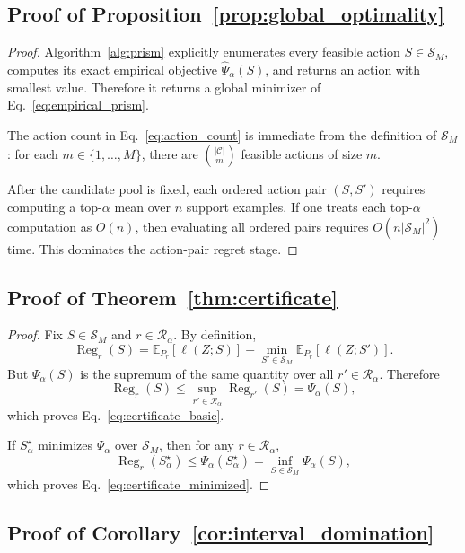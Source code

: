 \documentclass{article}
\newcommand{\EE}{\mathbb{E}}
\newcommand{\cC}{\mathcal{C}}
\newcommand{\cR}{\mathcal{R}}
\newcommand{\cS}{\mathcal{S}}
\newcommand{\loss}{\ell}
\newcommand{\1}{\mathbbm{1}}
\begin{document}
\subsection{Proof of Proposition~\ref{prop:global_optimality}}

\begin{proof}
Algorithm~\ref{alg:prism} explicitly enumerates every feasible action \(S\in\cS_M\), computes its exact empirical objective \(\widehat{\Psi}_\alpha(S)\), and returns an action with smallest value. Therefore it returns a global minimizer of Eq.~\eqref{eq:empirical_prism}.

The action count in Eq.~\eqref{eq:action_count} is immediate from the definition of \(\cS_M\): for each \(m\in\{1,\ldots,M\}\), there are \(\binom{|\cC|}{m}\) feasible actions of size \(m\).

After the candidate pool is fixed, each ordered action pair \((S,S')\) requires computing a top-\(\alpha\) mean over \(n\) support examples. If one treats each top-\(\alpha\) computation as \(O(n)\), then evaluating all ordered pairs requires \(O(n|\cS_M|^2)\) time. This dominates the action-pair regret stage.
\end{proof}

\subsection{Proof of Theorem~\ref{thm:certificate}}

\begin{proof}
Fix \(S\in\cS_M\) and \(r\in\cR_\alpha\). By definition,
\[
    \operatorname{Reg}_r(S)
    =
    \EE_{P_r}[\loss(Z;S)]
    -
    \min_{S'\in\cS_M} \EE_{P_r}[\loss(Z;S')].
\]
But \(\Psi_\alpha(S)\) is the supremum of the same quantity over all \(r'\in\cR_\alpha\). Therefore
\[
    \operatorname{Reg}_r(S) \le \sup_{r'\in\cR_\alpha} \operatorname{Reg}_{r'}(S) = \Psi_\alpha(S),
\]
which proves Eq.~\eqref{eq:certificate_basic}.

If \(S_\alpha^\star\) minimizes \(\Psi_\alpha\) over \(\cS_M\), then for any \(r\in\cR_\alpha\),
\[
    \operatorname{Reg}_r(S_\alpha^\star)
    \le
    \Psi_\alpha(S_\alpha^\star)
    =
    \inf_{S\in\cS_M}\Psi_\alpha(S),
\]
which proves Eq.~\eqref{eq:certificate_minimized}.
\end{proof}

\subsection{Proof of Corollary~\ref{cor:interval_domination}}
\end{document}
